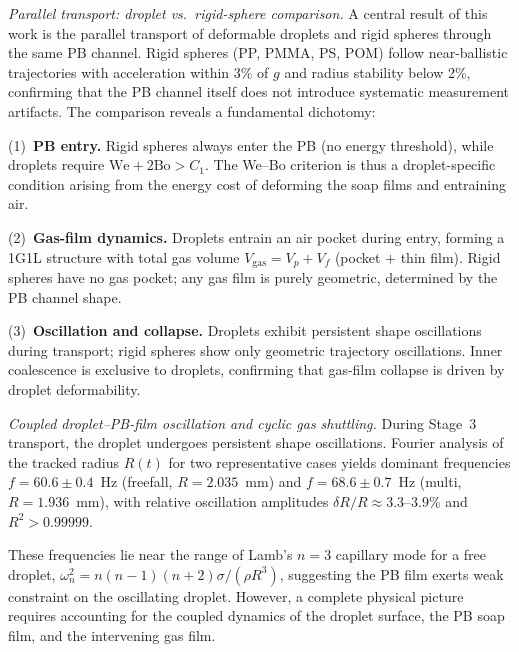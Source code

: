 \documentclass[%
 preprint,
 superscriptaddress,
 amsmath,amssymb,
 aps, prl,
]{revtex4-2}
\begin{document}
{\noindent\textit{Parallel transport: droplet vs.\ rigid-sphere comparison.}}
A central result of this work is the parallel transport of deformable droplets and rigid spheres through the same PB channel. Rigid spheres (PP, PMMA, PS, POM) follow near-ballistic trajectories with acceleration within 3\% of $g$ and radius stability below 2\%, confirming that the PB channel itself does not introduce systematic measurement artifacts. The comparison reveals a fundamental dichotomy:\par

(1)~\textbf{PB entry.} Rigid spheres always enter the PB (no energy threshold), while droplets require $\text{We} + 2\text{Bo} > C_1$. The We--Bo criterion is thus a droplet-specific condition arising from the energy cost of deforming the soap films and entraining air.\par

(2)~\textbf{Gas-film dynamics.} Droplets entrain an air pocket during entry, forming a 1G1L structure with total gas volume $V_{\text{gas}} = V_p + V_f$ (pocket $+$ thin film). Rigid spheres have no gas pocket; any gas film is purely geometric, determined by the PB channel shape.\par

(3)~\textbf{Oscillation and collapse.} Droplets exhibit persistent shape oscillations during transport; rigid spheres show only geometric trajectory oscillations. Inner coalescence is exclusive to droplets, confirming that gas-film collapse is driven by droplet deformability.\par

{\noindent\textit{Coupled droplet--PB-film oscillation and cyclic gas shuttling.}}
During Stage~3 transport, the droplet undergoes persistent shape oscillations. Fourier analysis of the tracked radius $R(t)$ for two representative cases yields dominant frequencies $f = 60.6 \pm 0.4$~Hz (freefall, $R = 2.035$~mm) and $f = 68.6 \pm 0.7$~Hz (multi, $R = 1.936$~mm), with relative oscillation amplitudes $\delta R / R \approx 3.3$--$3.9\%$ and $R^2 > 0.99999$.\par

These frequencies lie near the range of Lamb's $n=3$ capillary mode for a free droplet, $\omega_n^2 = n(n-1)(n+2)\sigma/(\rho R^3)$, suggesting the PB film exerts weak constraint on the oscillating droplet. However, a complete physical picture requires accounting for the coupled dynamics of the droplet surface, the PB soap film, and the intervening gas film.\par
\end{document}
